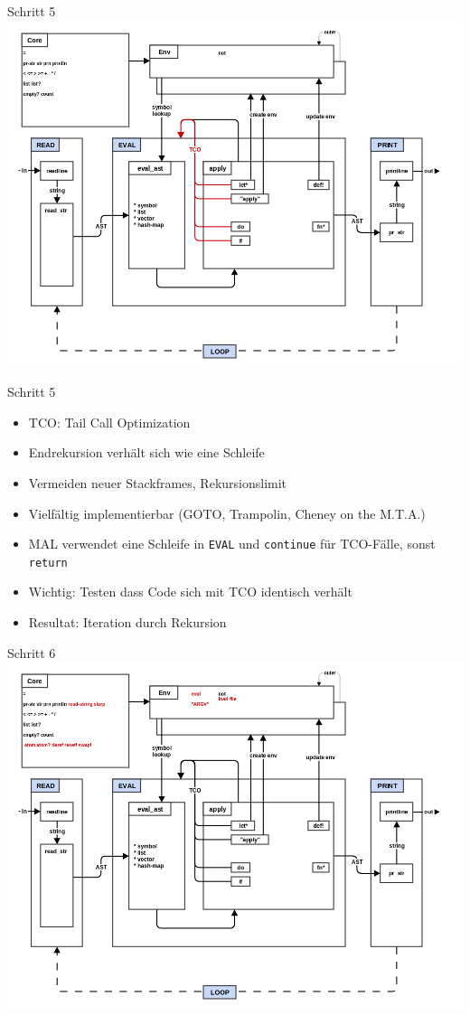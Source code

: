 \documentclass[presentation]{beamer}
\begin{document}
\begin{frame}[label=sec-3-16]{Schritt 5}
\includegraphics[width=.9\linewidth]{./images/step5_tco.png}
\end{frame}

\begin{frame}[fragile,label=sec-3-17]{Schritt 5}
 \begin{itemize}
\item TCO: Tail Call Optimization
\item Endrekursion verhält sich wie eine Schleife
\item Vermeiden neuer Stackframes, Rekursionslimit
\item Vielfältig implementierbar (GOTO, Trampolin, Cheney on the M.T.A.)
\item MAL verwendet eine Schleife in \texttt{EVAL} und \texttt{continue} für TCO-Fälle,
sonst \texttt{return}
\item Wichtig: Testen dass Code sich mit TCO identisch verhält
\item Resultat: Iteration durch Rekursion
\end{itemize}
\end{frame}

\begin{frame}[label=sec-3-18]{Schritt 6}
\includegraphics[width=.9\linewidth]{./images/step6_file.png}
\end{frame}
\end{document}
